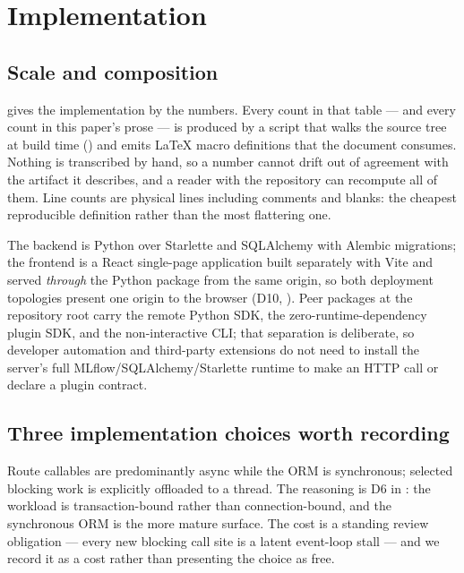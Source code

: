 \section{Implementation}
\label{sec:impl}



\subsection{Scale and composition}

 gives the implementation by the numbers. Every count in that
table --- and every count in this paper's prose --- is produced by a script that
walks the source tree at build time () and emits
LaTeX macro definitions that the document consumes. Nothing is transcribed by
hand, so a number cannot drift out of agreement with the artifact it describes, and
a reader with the repository can recompute all of them. Line counts are physical
lines including comments and blanks: the cheapest reproducible definition rather
than the most flattering one.

The backend is Python over Starlette and SQLAlchemy with Alembic migrations; the
frontend is a React single-page application built separately with Vite and served
\emph{through} the Python package from the same origin, so both deployment
topologies present one origin to the browser (D10, ).
Peer packages at the repository root carry the remote Python SDK, the
zero-runtime-dependency plugin SDK, and the non-interactive CLI; that separation is
deliberate, so developer automation and third-party extensions do not need to
install the server's full MLflow/SQLAlchemy/Starlette runtime to make an HTTP call
or declare a plugin contract.

\subsection{Three implementation choices worth recording}

 Route callables are predominantly
async while the ORM is synchronous; selected blocking work is explicitly offloaded
to a thread. The reasoning is D6 in : the workload is
transaction-bound rather than connection-bound, and the synchronous ORM is the more
mature surface. The cost is a standing review obligation --- every new blocking call
site is a latent event-loop stall --- and we record it as a cost rather than
presenting the choice as free.

